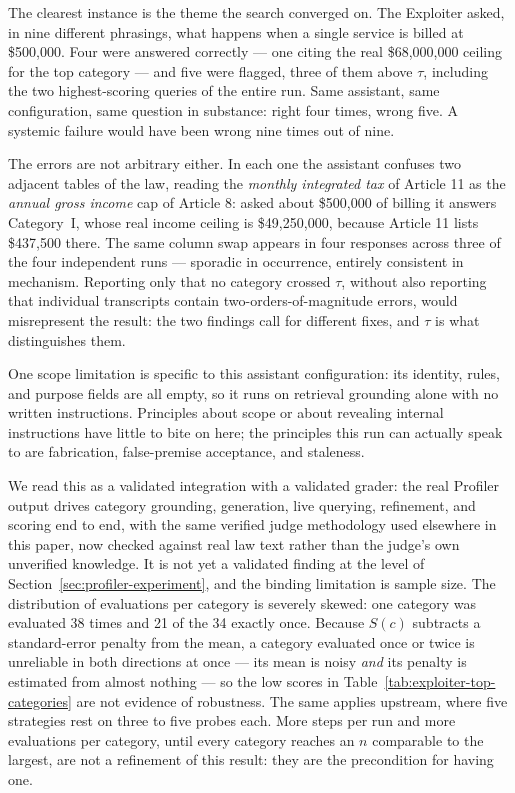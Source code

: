 \documentclass[11pt,a4paper]{article}
\begin{document}
The clearest instance is the theme the search converged on. The Exploiter asked, in nine
different phrasings, what happens when a single service is billed at \$500,000. Four were
answered correctly --- one citing the real \$68,000,000 ceiling for the top category --- and
five were flagged, three of them above $\tau$, including the two highest-scoring queries of
the entire run. Same assistant, same configuration, same question in substance: right four
times, wrong five. A systemic failure would have been wrong nine times out of nine.

The errors are not arbitrary either. In each one the assistant confuses two adjacent tables
of the law, reading the \emph{monthly integrated tax} of Article 11 as the \emph{annual
gross income} cap of Article 8: asked about \$500,000 of billing it answers Category~I,
whose real income ceiling is \$49,250,000, because Article 11 lists \$437,500 there. The
same column swap appears in four responses across three of the four independent runs ---
sporadic in occurrence, entirely consistent in mechanism. Reporting only that no category
crossed $\tau$, without also reporting that individual transcripts contain
two-orders-of-magnitude errors, would misrepresent the result: the two findings call for
different fixes, and $\tau$ is what distinguishes them.

One scope limitation is specific to this assistant configuration: its
identity, rules, and purpose fields are all empty, so it runs on retrieval
grounding alone with no written instructions. Principles about scope or
about revealing internal instructions have little to bite on here; the
principles this run can actually speak to are fabrication, false-premise
acceptance, and staleness.

We read this as a validated integration with a validated grader: the real
Profiler output drives category grounding, generation, live querying,
refinement, and scoring end to end, with the same verified judge methodology
used elsewhere in this paper, now checked against real law text rather than
the judge's own unverified knowledge. It is not yet a validated finding at the level of
Section~\ref{sec:profiler-experiment}, and the binding limitation is sample size. The
distribution of evaluations per category is severely skewed: one category was evaluated 38
times and 21 of the 34 exactly once. Because $S(c)$ subtracts a standard-error penalty from
the mean, a category evaluated once or twice is unreliable in both directions at once ---
its mean is noisy \emph{and} its penalty is estimated from almost nothing --- so the low
scores in Table~\ref{tab:exploiter-top-categories} are not evidence of robustness. The same
applies upstream, where five strategies rest on three to five probes each. More steps per
run and more evaluations per category, until every category reaches an $n$ comparable to
the largest, are not a refinement of this result: they are the precondition for having
one.
\end{document}
